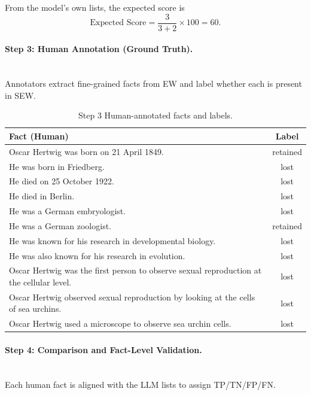 \documentclass{DESSThesis}
\begin{document}
From the model’s own lists, the expected score is
\[
\text{Expected Score}=\frac{3}{3+2}\times100=60.
\]

\paragraph{Step 3: Human Annotation (Ground Truth).}\\

Annotators extract fine-grained facts from EW and label whether each is present in SEW.

\begin{table}[H]
\centering
\caption{Step 3  Human-annotated facts and labels.}
\label{tab:human_list_hertwig}
\renewcommand{\arraystretch}{1.15}
\setlength{\tabcolsep}{6pt}
\begin{tabularx}{\textwidth}{X c}
\toprule
\textbf{Fact (Human)} & \textbf{Label} \\
\midrule
Oscar Hertwig was born on 21 April 1849. & retained \\
He was born in Friedberg. & lost \\
He died on 25 October 1922. & lost \\
He died in Berlin. & lost \\
He was a German embryologist. & lost \\
He was a German zoologist. & retained \\
He was known for his research in developmental biology. & lost \\
He was also known for his research in evolution. & lost \\
Oscar Hertwig was the first person to observe sexual reproduction at the cellular level. & lost \\
Oscar Hertwig observed sexual reproduction by looking at the cells of sea urchins. & lost \\
Oscar Hertwig used a microscope to observe sea urchin cells. & lost \\
\bottomrule
\end{tabularx}
\end{table}

\paragraph{Step 4: Comparison and Fact-Level Validation.}\\

Each human fact is aligned with the LLM lists to assign TP/TN/FP/FN.
\end{document}
